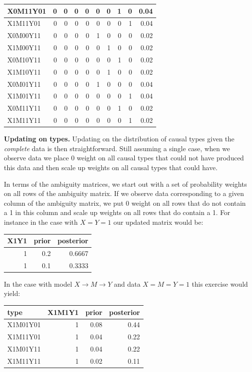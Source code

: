 \documentclass[12pt,]{book}
\begin{document}
\begin{table}[t]
\begin{tabular}{l|r|r|r|r|r|r|r|r|r}
\hline
X0M11Y01 & 0 & 0 & 0 & 0 & 0 & 0 & 1 & 0 & 0.04\\
\hline
X1M11Y01 & 0 & 0 & 0 & 0 & 0 & 0 & 0 & 1 & 0.04\\
\hline
X0M00Y11 & 0 & 0 & 0 & 0 & 1 & 0 & 0 & 0 & 0.02\\
\hline
X1M00Y11 & 0 & 0 & 0 & 0 & 0 & 1 & 0 & 0 & 0.02\\
\hline
X0M10Y11 & 0 & 0 & 0 & 0 & 0 & 0 & 1 & 0 & 0.02\\
\hline
X1M10Y11 & 0 & 0 & 0 & 0 & 0 & 1 & 0 & 0 & 0.02\\
\hline
X0M01Y11 & 0 & 0 & 0 & 0 & 1 & 0 & 0 & 0 & 0.04\\
\hline
X1M01Y11 & 0 & 0 & 0 & 0 & 0 & 0 & 0 & 1 & 0.04\\
\hline
X0M11Y11 & 0 & 0 & 0 & 0 & 0 & 0 & 1 & 0 & 0.02\\
\hline
X1M11Y11 & 0 & 0 & 0 & 0 & 0 & 0 & 0 & 1 & 0.02\\
\hline
\end{tabular}
\end{table}

\textbf{Updating on types.} Updating on the distribution of causal types given the \emph{complete} data is then straightforward. Still assuming a single case, when we observe data we place 0 weight on all causal types that could not have produced this data and then scale up weights on all causal types that could have.

In terms of the ambiguity matrices, we start out with a set of probability weights on all rows of the ambiguity matrix. If we observe data corresponding to a given column of the ambiguity matrix, we put 0 weight on all rows that do not contain a 1 in this column and scale up weights on all rows that do contain a 1. For instance in the case with \(X=Y=1\) our updated matrix would be:

\begin{tabular}{r|r|r}
\hline
X1Y1 & prior & posterior\\
\hline
1 & 0.2 & 0.6667\\
\hline
1 & 0.1 & 0.3333\\
\hline
\end{tabular}

In the case with model \(X \rightarrow M \rightarrow Y\) and data \(X=M=Y=1\) this exercise would yield:

\begin{tabular}{l|r|r|r}
\hline
type & X1M1Y1 & prior & posterior\\
\hline
X1M01Y01 & 1 & 0.08 & 0.44\\
\hline
X1M11Y01 & 1 & 0.04 & 0.22\\
\hline
X1M01Y11 & 1 & 0.04 & 0.22\\
\hline
X1M11Y11 & 1 & 0.02 & 0.11\\
\hline
\end{tabular}
\end{document}
